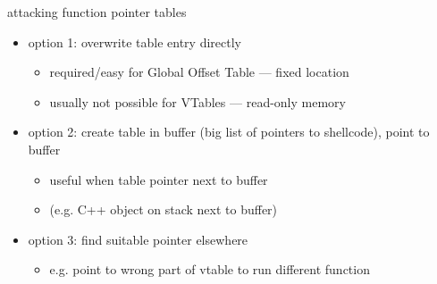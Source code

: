 
\begin{frame}{attacking function pointer tables}
\begin{itemize}
\item option 1: overwrite table entry directly  
    \begin{itemize}
    \item required/easy for Global Offset Table --- fixed location
    \item usually not possible for VTables --- read-only memory
    \end{itemize}
\item option 2: create table in buffer (big list of pointers to shellcode), point to buffer
    \begin{itemize}
    \item useful when table pointer next to buffer
    \item (e.g. C++ object on stack next to buffer)
    \end{itemize}
\item option 3: find suitable pointer elsewhere
    \begin{itemize}
    \item e.g. point to wrong part of vtable to run different function
    \end{itemize}
\end{itemize}
\end{frame}


